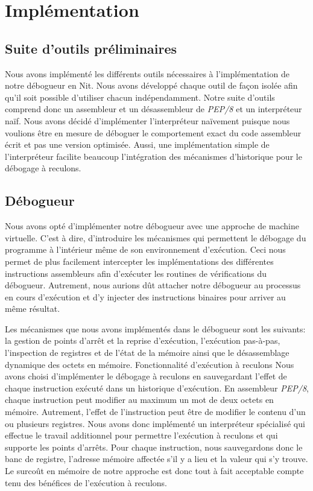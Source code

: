 \documentclass{article}
\begin{document}
\section{Implémentation}\label{impluxe9mentation}

\subsection{Suite d'outils
préliminaires}\label{suite-doutils-pruxe9liminaires}

Nous avons implémenté les différents outils nécessaires à
l'implémentation de notre débogueur en Nit. Nous avons développé chaque
outil de façon isolée afin qu'il soit possible d'utiliser chacun
indépendamment. Notre suite d'outils comprend donc un assembleur et un
désassembleur de \emph{PEP/8} et un interpréteur naïf. Nous avons décidé
d'implémenter l'interpréteur naïvement puisque nous voulions être en
mesure de déboguer le comportement exact du code assembleur écrit et pas
une version optimisée. Aussi, une implémentation simple de
l'interpréteur facilite beaucoup l'intégration des mécanismes
d'historique pour le débogage à reculons.

\subsection{Débogueur}\label{duxe9bogueur}

Nous avons opté d'implémenter notre débogueur avec une approche de
machine virtuelle. C'est à dire, d'introduire les mécanismes qui
permettent le débogage du programme à l'intérieur même de son
environnement d'exécution. Ceci nous permet de plus facilement
intercepter les implémentations des différentes instructions assembleurs
afin d'exécuter les routines de vérifications du débogueur. Autrement,
nous aurions dût attacher notre débogueur au processus en cours
d'exécution et d'y injecter des instructions binaires pour arriver au
même résultat.

Les mécanismes que nous avons implémentés dans le débogueur sont les
suivants: la gestion de points d'arrêt et la reprise d'exécution,
l'exécution pas-à-pas, l'inspection de registres et de l'état de la
mémoire ainsi que le désassemblage dynamique des octets en mémoire.
Fonctionnalité d'exécution à reculons Nous avons choisi d'implémenter le
débogage à reculons en sauvegardant l'effet de chaque instruction
exécuté dans un historique d'exécution. En assembleur \emph{PEP/8},
chaque instruction peut modifier au maximum un mot de deux octets en
mémoire. Autrement, l'effet de l'instruction peut être de modifier le
contenu d'un ou plusieurs registres. Nous avons donc implémenté un
interpréteur spécialisé qui effectue le travail additionnel pour
permettre l'exécution à reculons et qui supporte les points d'arrêts.
Pour chaque instruction, nous sauvegardons donc le banc de registre,
l'adresse mémoire affectée s'il y a lieu et la valeur qui s'y trouve. Le
surcoût en mémoire de notre approche est donc tout à fait acceptable
compte tenu des bénéfices de l'exécution à reculons.
\end{document}
